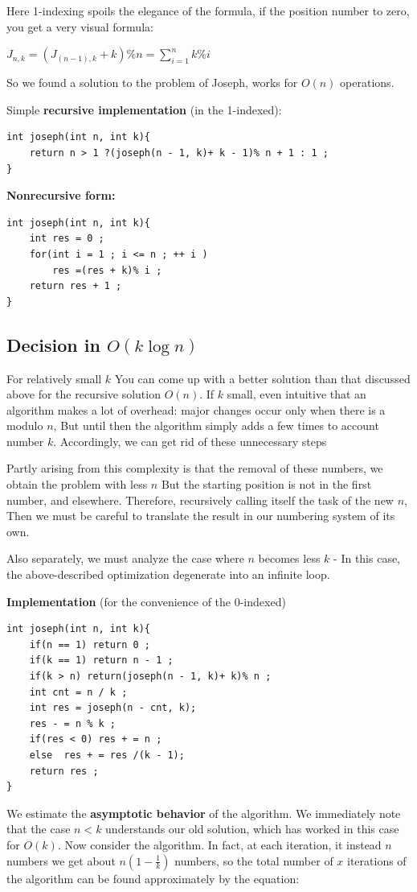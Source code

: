 Here 1-indexing spoils the elegance of the formula, if the position number to zero, you get a very visual formula:

$J_{n,k}=(J_{(n-1),k}+k)\%n=\sum_{i=1}^{n}k\%i$

So we found a solution to the problem of Joseph, works for $O (n)$ operations.

Simple \textbf{recursive implementation} (in the 1-indexed):
\begin{verbatim}
int joseph(int n, int k){
    return n > 1 ?(joseph(n - 1, k)+ k - 1)% n + 1 : 1 ;
} 
\end{verbatim}
\textbf{Nonrecursive form:} \begin{verbatim}
int joseph(int n, int k){
    int res = 0 ;
    for(int i = 1 ; i <= n ; ++ i )
        res =(res + k)% i ;
    return res + 1 ;
} 
\end{verbatim}
\subsection{ Decision in $O (k \log n)$}

For relatively small $k$ You can come up with a better solution than that discussed above for the recursive solution $O (n)$. If $k$ small, even intuitive that an algorithm makes a lot of overhead: major changes occur only when there is a modulo $n$, But until then the algorithm simply adds a few times to account number $k$. Accordingly, we can get rid of these unnecessary steps

Partly arising from this complexity is that the removal of these numbers, we obtain the problem with less $n$ But the starting position is not in the first number, and elsewhere. Therefore, recursively calling itself the task of the new $n$, Then we must be careful to translate the result in our numbering system of its own.

Also separately, we must analyze the case where $n$ becomes less $k$ - In this case, the above-described optimization degenerate into an infinite loop.

\textbf{Implementation} (for the convenience of the 0-indexed) \begin{verbatim}
int joseph(int n, int k){
    if(n == 1) return 0 ;
    if(k == 1) return n - 1 ;
    if(k > n) return(joseph(n - 1, k)+ k)% n ;
    int cnt = n / k ;
    int res = joseph(n - cnt, k);
    res - = n % k ;
    if(res < 0) res + = n ;
    else  res + = res /(k - 1);
    return res ;
} 
\end{verbatim}
We estimate the \textbf{asymptotic behavior} of the algorithm. We immediately note that the case $n <k$ understands our old solution, which has worked in this case for $O (k)$. Now consider the algorithm. In fact, at each iteration, it instead $n$ numbers we get about $n \left (1 - \frac {1} {k} \right)$ numbers, so the total number of $x$ iterations of the algorithm can be found approximately by the equation:

